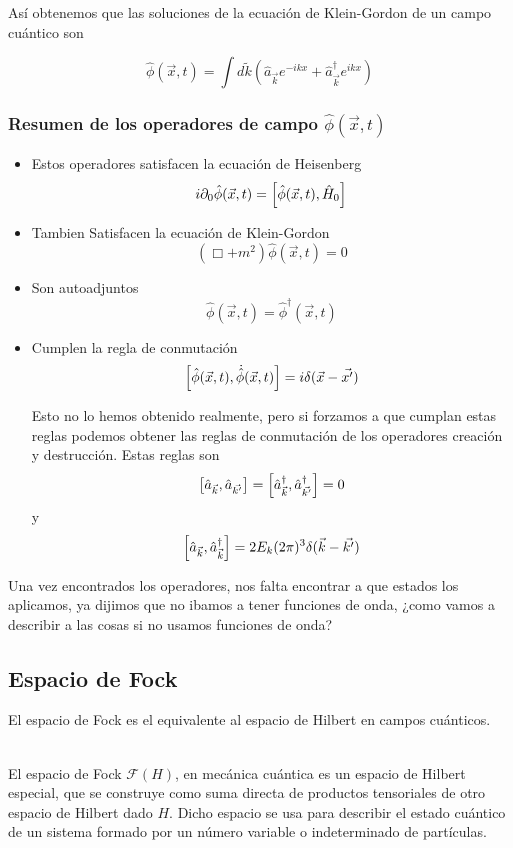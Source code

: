 Así obtenemos que las soluciones de la ecuación de Klein-Gordon de un campo cuántico son 

\[\hat{\phi}(\vec{x},t)=\int d \tilde{k} (\hat{a}_{\vec{k}}e^{-ikx}+\hat{a}^{\dagger}_{\vec{k}}e^{ikx})\]

\subsubsection{Resumen de los operadores de campo $\hat{\phi}(\vec{x},t)$}

\begin{itemize}
  \item Estos operadores satisfacen la ecuación de Heisenberg 
  \[i\partial_{0}\hat{\phi}(\vec{x},t)=\comm{\hat{\phi}(\vec{x},t)}{\hat{H}_{0}}\]
  \item Tambien Satisfacen la ecuación de Klein-Gordon
  \[(\Box +m^{2})\hat{\phi}(\vec{x},t)=0\]
  \item Son autoadjuntos 
  \[\hat{\phi}(\vec{x},t)=\hat{\phi}^{\dagger}(\vec{x},t)\]
  \item Cumplen la regla de conmutación
  \[\comm{\hat{\phi}(\vec{x},t)}{\dot{\hat{\phi}}(\vec{x},t)}=i\delta(\vec{x}-\vec{x'})\]
  
  Esto no lo hemos obtenido realmente, pero si forzamos a que cumplan estas reglas podemos obtener las reglas de conmutación de los operadores creación y destrucción. Estas reglas son
  \[\comm{\hat{a}_{\vec{k}}}{\hat{a}_{\vec{k'}}}=\comm{\hat{a}^{\dagger}_{\vec{k}}}{\hat{a}^{\dagger}_{\vec{k'}}}=0\]
  y \[\comm{\hat{a}_{\vec{k}}}{\hat{a}^{\dagger}_{\vec{k}}}= 2E_{k}(2\pi)^{3}\delta(\vec{k}-\vec{k'})\]
\end{itemize}

Una vez encontrados los operadores, nos falta encontrar a que estados los aplicamos, ya dijimos que no ibamos a tener funciones de onda, ¿como vamos a describir a las cosas si no usamos funciones de onda?

\subsection{Espacio de Fock}

El espacio de Fock es el equivalente al espacio de Hilbert en campos cuánticos. 

\begin{definition} 
\\
  El espacio de Fock ${\mathcal {F}}(H)$, en mecánica cuántica es un espacio de Hilbert especial, que se construye como suma directa de productos tensoriales de otro espacio de Hilbert dado 
$H$. Dicho espacio se usa para describir el estado cuántico de un sistema formado por un número variable o indeterminado de partículas.
  
\end{definition}

